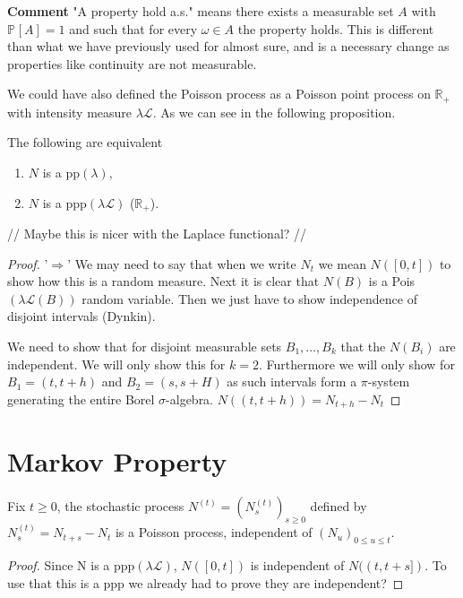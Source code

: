 {\color{blue}
\noindent \textbf{Comment} "A property hold a.s." means there exists a measurable set $A$ with $\mathbb{P}_{} \left[ A \right] =1$ and such that for every $\omega \in A$ the property holds. This is different than what we have previously used for almost sure, and is a necessary change as properties like continuity are not measurable.

\begin{rmk}[]
	We could have also defined the Poisson process as a Poisson point process on $\mathbb{R}_+$ with intensity measure $\lambda \mathcal{L}$. As we can see in the following proposition.
\end{rmk}
\begin{prop}[]
	The following are equivalent
\begin{enumerate}
	\item $N$ is a pp$(\lambda)$,
	\item $N$ is a ppp$(\lambda \mathcal{L})$ ($\mathbb{R}_+$).
\end{enumerate}
\end{prop}
// Maybe this is nicer with the Laplace functional? //
\begin{proof}
	'$\Longrightarrow$' We may need to say that when we write $N_t$ we mean $N([0,t])$ to show how this is a random measure. Next it is clear that $N(B)$ is a Pois$(\lambda \mathcal{L}(B))$ random variable. Then we just have to show independence of disjoint intervals (Dynkin). 

	We need to show that for disjoint measurable sets $B_1,\ldots ,B_k$ that the $N(B_i)$ are independent. We will only show this for $k=2$. Furthermore we will only show for $B_1 =(t,t+h)$ and $B_2=(s,s+H)$ as such intervals form a $\pi $-system generating the entire Borel $\sigma $-algebra. $N((t,t+h)) = N_{t+h}-N_{t}$
\end{proof}


}

\section{Markov Property}
\begin{theorem}
	Fix $t\geq 0$, the stochastic process $N^{(t)}=(N^{(t)}_{s})_{s \geq 0}$ defined by $N^{(t)}_s = N_{t+s}-N_{t}$ is a Poisson process, independent of $(N_u)_{0 \leq u \leq t}$.
\end{theorem}
{\color{blue}
\begin{proof}
	Since N is a ppp$(\lambda \mathcal{L})$, $N([0,t])$ is independent of $N((t,t+s])$. To use that this is a ppp we already had to prove they are independent?	
\end{proof}}


